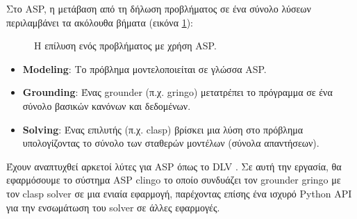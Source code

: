 \documentclass[12pt]{extarticle}
\begin{document}
Στο ASP, η μετάβαση από τη δήλωση προβλήματος σε ένα σύνολο λύσεων περιλαμβάνει τα ακόλουθα βήματα \cite{Gebser2013}
(εικόνα \ref{fig:asp-solving}):

\begin{figure}[htb]
    \begin{center}
    \end{center}
    \caption{Η επίλυση ενός προβλήματος με χρήση ASP.}
    \label{fig:asp-solving}
\end{figure}



\begin{itemize}
    \item \textbf{Modeling}: Το πρόβλημα μοντελοποιείται σε γλώσσα ASP.
    \item \textbf{Grounding}: Ένας grounder (π.χ. gringo) μετατρέπει το πρόγραμμα σε ένα σύνολο βασικών κανόνων και δεδομένων.
    \item \textbf{Solving}: Ένας επιλυτής (π.χ. clasp) βρίσκει μια λύση στο πρόβλημα υπολογίζοντας το σύνολο των σταθερών μοντέλων (σύνολα απαντήσεων).
\end{itemize}


Έχουν αναπτυχθεί αρκετοί λύτες για ASP όπως το DLV \cite{Xia2020}. Σε αυτή την εργασία, θα εφαρμόσουμε το σύστημα ASP clingo \cite{Gebser2014} το οποίο συνδυάζει τον grounder gringo με τον clasp solver\cite{Holldobler2014} σε μια ενιαία εφαρμογή, παρέχοντας επίσης ένα ισχυρό Python API για την ενσωμάτωση του solver σε άλλες εφαρμογές.
\end{document}
